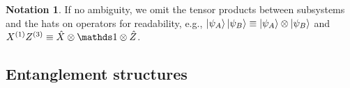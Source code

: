 \documentclass[
reprint,
aps,
pra,
floatfix,
]{revtex4-2}
\theoremstyle{plain}
\theoremstyle{definition}
\newtheorem{notation}{Notation}
\newcommand{\px}{X}
\newcommand{\pz}{Z}
\begin{document}

\begin{notation}
	If no ambiguity,
	we omit the tensor products between subsystems and the hats on operators for readability,
	e.g.,
	$\ket{\psi_A}\ket{\psi_B}\equiv \ket{\psi_A}\otimes \ket{\psi_B}$ 
	and $\px^{(1)}\pz^{(3)} \equiv \hat{X} \otimes \identity \otimes \hat{Z}$.
\end{notation}

\subsection{Entanglement structures}
\end{document}
